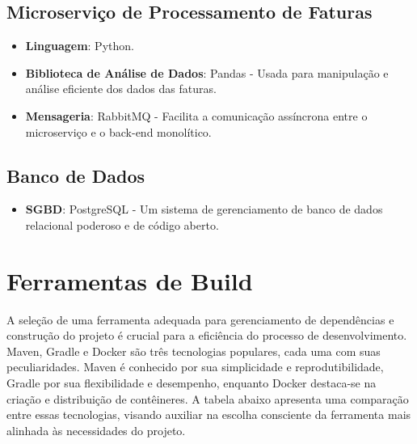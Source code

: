 \subsection{Microserviço de Processamento de Faturas}
\begin{itemize}
	\item \textbf{Linguagem}: Python.
	\item \textbf{Biblioteca de Análise de Dados}: Pandas - Usada para manipulação e análise eficiente dos dados das faturas.
	\item \textbf{Mensageria}: RabbitMQ - Facilita a comunicação assíncrona entre o microserviço e o back-end monolítico.
\end{itemize}


\subsection{Banco de Dados}
\begin{itemize}
	\item \textbf{SGBD}: PostgreSQL - Um sistema de gerenciamento de banco de dados relacional poderoso e de código aberto.
\end{itemize}

\section{Ferramentas de Build}
A seleção de uma ferramenta adequada para gerenciamento de dependências e construção do projeto é crucial para a eficiência do processo de desenvolvimento. Maven, Gradle e Docker são três tecnologias populares, cada uma com suas peculiaridades. Maven é conhecido por sua simplicidade e reprodutibilidade, Gradle por sua flexibilidade e desempenho, enquanto Docker destaca-se na criação e distribuição de contêineres. A tabela abaixo apresenta uma comparação entre essas tecnologias, visando auxiliar na escolha consciente da ferramenta mais alinhada às necessidades do projeto.

